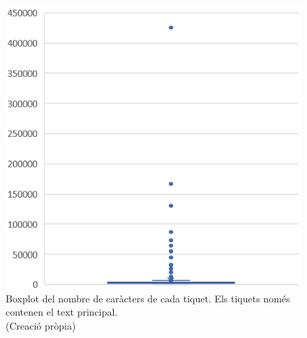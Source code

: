 \begin{figure}[H]
    \centering
    \includegraphics[width=\textwidth]{boxplot_num_chars_tiquets.png}
    \caption[Boxplot dels caràcters del text principal de cada tiquet]{Boxplot del nombre de caràcters de cada tiquet. Els tiquets només contenen el text principal. \\ (Creació pròpia)}
    \label{fig:boxplot_num_chars_tiquets}
\end{figure}

